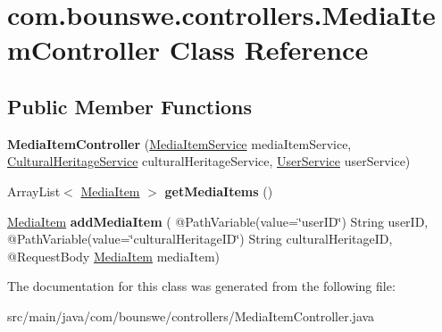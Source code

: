 \hypertarget{classcom_1_1bounswe_1_1controllers_1_1_media_item_controller}{}\section{com.\+bounswe.\+controllers.\+Media\+Item\+Controller Class Reference}
\label{classcom_1_1bounswe_1_1controllers_1_1_media_item_controller}
\subsection*{Public Member Functions}
\begin{DoxyCompactItemize}
\item 
\mbox{\label{classcom_1_1bounswe_1_1controllers_1_1_media_item_controller_a450b0e313459a507bd78e8f090d2b305}} 
{\bfseries Media\+Item\+Controller} (\hyperlink{classcom_1_1bounswe_1_1services_1_1_media_item_service}{Media\+Item\+Service} media\+Item\+Service, \hyperlink{classcom_1_1bounswe_1_1services_1_1_cultural_heritage_service}{Cultural\+Heritage\+Service} cultural\+Heritage\+Service, \hyperlink{classcom_1_1bounswe_1_1services_1_1_user_service}{User\+Service} user\+Service)
\item 
\mbox{\label{classcom_1_1bounswe_1_1controllers_1_1_media_item_controller_a701cffcefc68eb0ce55acea2fe7a3ef2}} 
Array\+List$<$ \hyperlink{classcom_1_1bounswe_1_1models_1_1_media_item}{Media\+Item} $>$ {\bfseries get\+Media\+Items} ()
\item 
\mbox{\label{classcom_1_1bounswe_1_1controllers_1_1_media_item_controller_a9c0b38769ee6fd53b8f57e8bab5bf944}} 
\hyperlink{classcom_1_1bounswe_1_1models_1_1_media_item}{Media\+Item} {\bfseries add\+Media\+Item} ( @Path\+Variable(value=\char`\"{}user\+ID\char`\"{}) String user\+ID, @Path\+Variable(value=\char`\"{}cultural\+Heritage\+ID\char`\"{}) String cultural\+Heritage\+ID, @Request\+Body \hyperlink{classcom_1_1bounswe_1_1models_1_1_media_item}{Media\+Item} media\+Item)
\end{DoxyCompactItemize}


The documentation for this class was generated from the following file\+:\begin{DoxyCompactItemize}
\item 
src/main/java/com/bounswe/controllers/Media\+Item\+Controller.\+java\end{DoxyCompactItemize}
